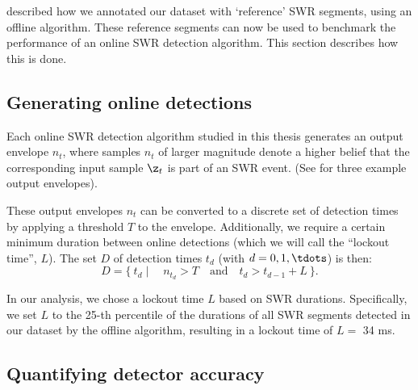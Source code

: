 \label{sec:eval}

 described how we annotated our dataset with `reference' SWR segments, using an offline algorithm. These reference segments can now be used to benchmark the performance of an online SWR detection algorithm. This section describes how this is done.



\subsection{Generating online detections}

Each online SWR detection algorithm studied in this thesis generates an output envelope $n_t$, where samples $n_t$ of larger magnitude denote a higher belief that the corresponding input sample $\z_t$ is part of an SWR event. (See  for three example output envelopes).

These output envelopes $n_t$ can be converted to a discrete set of detection times by applying a threshold $T$ to the envelope.\footnotemark{} Additionally, we require a certain minimum duration between online detections (which we will call the ``lockout time'', $L$). The set $D$ of detection times $t_d$ (with $d = 0, 1, \tdots$) is then:
\begin{equation}
D = \{ \ t_d \mid \quad  n_{t_d} > T  \quad 
                  \text{and} \quad  t_d > t_{d-1} + L  \ \}.
\end{equation}



In our analysis, we chose a lockout time $L$ based on SWR durations. Specifically, we set $L$ to the 25-th percentile of the durations of all SWR segments detected in our dataset by the offline algorithm, resulting in a lockout time of $L = $ 34 ms.



\subsection{Quantifying detector accuracy}

